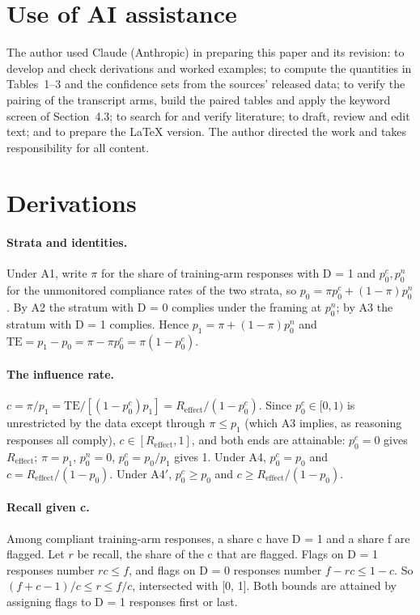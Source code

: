 \documentclass[11pt]{article}
\newcommand{\Reff}{R_{\mathrm{effect}}}
\begin{document}
\section*{Use of AI assistance}
The author used Claude (Anthropic) in preparing this paper and its revision: to develop and check derivations and worked examples; to compute the quantities in Tables~1--3 and the confidence sets from the sources' released data; to verify the pairing of the transcript arms, build the paired tables and apply the keyword screen of Section~4.3; to search for and verify literature; to draft, review and edit text; and to prepare the \LaTeX{} version. The author directed the work and takes responsibility for all content.



\appendix

\section{Derivations}

\paragraph{Strata and identities.} Under A1, write $\pi$ for the share of training-arm responses with D = 1 and $p_0^{c}, p_0^{n}$ for the unmonitored compliance rates of the two strata, so $p_0 = \pi p_0^{c} + (1 - \pi)p_0^{n}$. By A2 the stratum with D = 0 complies under the framing at $p_0^{n}$; by A3 the stratum with D = 1 complies. Hence $p_1 = \pi + (1 - \pi)p_0^{n}$ and $\mathrm{TE} = p_1 - p_0 = \pi - \pi p_0^{c} = \pi(1 - p_0^{c})$.

\paragraph{The influence rate.} $c = \pi/p_1 = \mathrm{TE}/[(1 - p_0^{c})p_1] = \Reff/(1 - p_0^{c})$. Since $p_0^{c} \in [0, 1)$ is unrestricted by the data except through $\pi \leq p_1$ (which A3 implies, as reasoning responses all comply), $c \in [\Reff, 1]$, and both ends are attainable: $p_0^{c} = 0$ gives $\Reff$; $\pi = p_1$, $p_0^{n} = 0$, $p_0^{c} = p_0/p_1$ gives 1. Under A4, $p_0^{c} = p_0$ and $c = \Reff/(1 - p_0)$. Under A4$'$, $p_0^{c} \geq p_0$ and $c \geq \Reff/(1 - p_0)$.

\paragraph{Recall given c.} Among compliant training-arm responses, a share c have D = 1 and a share f are flagged. Let $r$ be recall, the share of the c that are flagged. Flags on D = 1 responses number $rc \leq f$, and flags on D = 0 responses number $f - rc \leq 1 - c$. So $(f + c - 1)/c \leq r \leq f/c$, intersected with [0, 1]. Both bounds are attained by assigning flags to D = 1 responses first or last.
\end{document}
